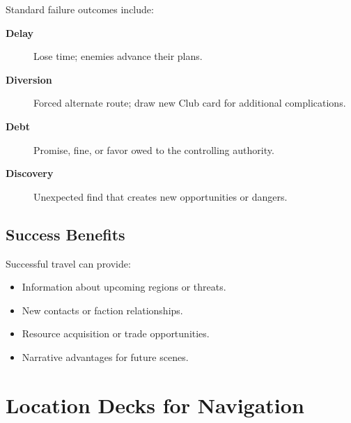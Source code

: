 Standard failure outcomes include:
\begin{description}
\item[\textbf{Delay}] Lose time; enemies advance their plans.
\item[\textbf{Diversion}] Forced alternate route; draw new Club card for additional complications.
\item[\textbf{Debt}] Promise, fine, or favor owed to the controlling authority.
\item[\textbf{Discovery}] Unexpected find that creates new opportunities or dangers.
\end{description}

\subsection{Success Benefits}
\label{subsec:success-benefits}

Successful travel can provide:
\begin{itemize}
\item Information about upcoming regions or threats.
\item New contacts or faction relationships.
\item Resource acquisition or trade opportunities.
\item Narrative advantages for future scenes.
\end{itemize}

\section{Location Decks for Navigation}
























